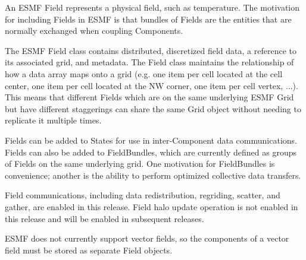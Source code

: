 
An ESMF Field represents a physical field, such as temperature.
The motivation for including Fields in ESMF is that bundles of 
Fields are the entities that are normally exchanged when coupling
Components.  

The ESMF Field class contains distributed, discretized field data, a reference 
to its associated grid, and metadata.  The Field class maintains the
relationship of how a data array maps onto a grid (e.g. one item per
cell located at the cell center, one item per cell located at the NW
corner,  one item per cell vertex, ...).  This means that different Fields
which are on the same underlying ESMF Grid but have different
staggerings can share the same Grid object without needing to replicate
it multiple times. 

Fields can be added to States for use in inter-Component
data communications.  Fields can also be added to FieldBundles,
which are currently defined as groups of Fields on the same underlying
grid.  One motivation for FieldBundles is convenience; another is the
ability to perform optimized collective data transfers.  

Field communications, including data redistribution, regriding, scatter,
and gather, are enabled in this release.  Field halo update operation is
not enabled in this release and will be enabled in subsequent releases.

ESMF does not currently support vector fields, so the components of 
a vector field must be stored as separate Field objects.  


